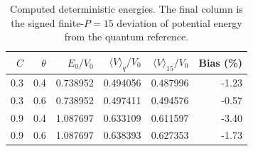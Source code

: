 \begin{table}[H]
\centering\small
\begin{tabular}{rrrrrr}
\toprule
$C$ & $\theta$ & $E_0/V_0$ & $\langle V\rangle_q/V_0$ & $\langle V\rangle_{15}/V_0$ & Bias (\%)\\
\midrule
0.3 & 0.4 & 0.738952 & 0.494056 & 0.487996 & -1.23 \\
0.3 & 0.6 & 0.738952 & 0.497411 & 0.494576 & -0.57 \\
0.9 & 0.4 & 1.087697 & 0.633109 & 0.611597 & -3.40 \\
0.9 & 0.6 & 1.087697 & 0.638393 & 0.627353 & -1.73 \\
\bottomrule
\end{tabular}
\caption{Computed deterministic energies. The final column is the signed finite-$P=15$ deviation of potential energy from the quantum reference.}
\label{tab:quantum}
\end{table}
